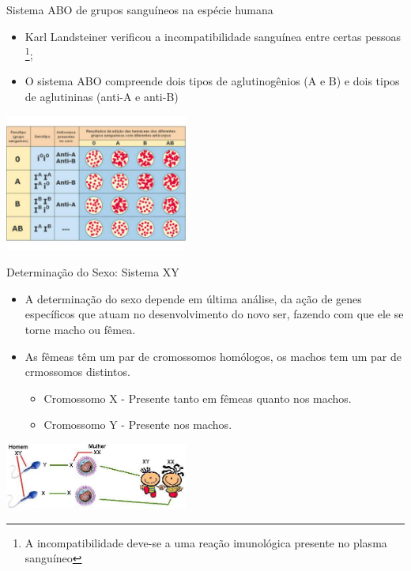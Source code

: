 \documentclass[]{beamer}
\begin{document}
  \begin{frame}{Sistema ABO de grupos sanguíneos na espécie humana}
    \begin{center}
      \begin{multicols}{2}
        \begin{itemize}
          \item Karl Landsteiner verificou a incompatibilidade sanguínea entre certas pessoas
            \footnote{
              A incompatibilidade deve-se a uma reação imunológica presente no plasma sanguíneo
            };
          \item O sistema ABO compreende dois tipos de aglutinogênios (A e B) e dois tipos de aglutininas (anti-A e anti-B)
        \end{itemize}

        \columnbreak
        \includegraphics[width=6cm]{images/abo.png}
      \end{multicols}
    \end{center}
  \end{frame}

  \begin{frame}{Determinação do Sexo: Sistema XY}
    \begin{center}
      \begin{itemize}
        \item A determinação do sexo depende em última análise, da ação de genes específicos que atuam no desenvolvimento do novo ser, fazendo com que ele se torne macho ou fêmea.
        \item As fêmeas têm um par de cromossomos homólogos, os machos tem um par de crmossomos distintos.
        \begin{itemize}
          \item Cromossomo X - Presente tanto em fêmeas quanto nos machos.
          \item Cromossomo Y - Presente nos machos.
        \end{itemize}
      \end{itemize}

      \hspace{0.5cm}

      \includegraphics[width=6cm]{images/xy.png}
    \end{center}
  \end{frame}
\end{document}
